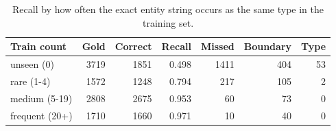 \begin{table}[t]
\centering
\small
\caption{Recall by how often the exact entity string occurs as the same type in the training set.}
\label{tab:freq}
\begin{tabular}{lrrrrrr}
\toprule
Train count & Gold & Correct & Recall & Missed & Boundary & Type \\
\midrule
unseen (0) & 3719 & 1851 & 0.498 & 1411 & 404 & 53 \\
rare (1-4) & 1572 & 1248 & 0.794 & 217 & 105 & 2 \\
medium (5-19) & 2808 & 2675 & 0.953 & 60 & 73 & 0 \\
frequent (20+) & 1710 & 1660 & 0.971 & 10 & 40 & 0 \\
\bottomrule
\end{tabular}
\end{table}
